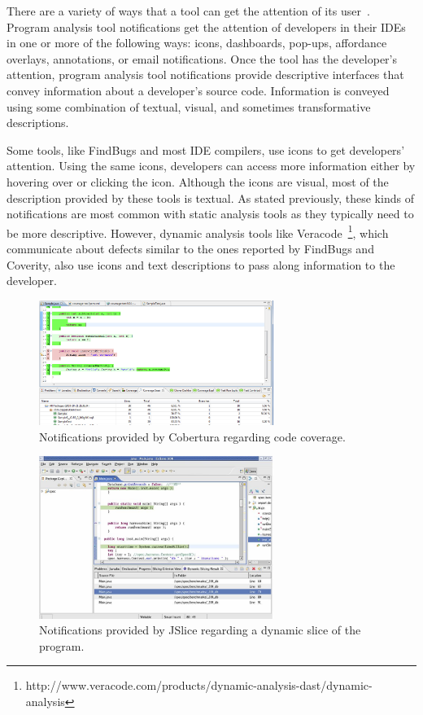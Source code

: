 \documentclass{llncs}
\begin{document}
There are a variety of ways that a tool can get the attention of its user~\cite{robillard2014recommendation}. Program analysis tool notifications get the attention of developers in their IDEs in one or more of the following ways: icons, dashboards, pop-ups, affordance overlays, annotations, or email notifications.
Once the tool has the developer's attention, program analysis tool notifications provide descriptive interfaces that convey information about a developer's source code. 
Information is conveyed using some combination of textual, visual, and sometimes transformative descriptions.

Some tools, like FindBugs and most IDE compilers, use icons to get developers' attention. Using the same icons, developers can access more information either by hovering over or clicking the icon. Although the icons are visual, most of the description provided by these tools is textual. As stated previously, these kinds of notifications are most common with static analysis tools as they typically need to be more descriptive. However, dynamic analysis tools like Veracode~\footnote{http://www.veracode.com/products/dynamic-analysis-dast/dynamic-analysis}, which communicate about defects similar to the ones reported by FindBugs and Coverity, also use icons and text descriptions to pass along information to the developer.

\begin{figure}
	\centering
	\includegraphics[width=3in]{figs/cobertura.png}
	\caption{Notifications provided by Cobertura regarding code coverage.}
	\label{fig:cobertura}
\end{figure}

\begin{figure}
	\centering
	\includegraphics[width=3in]{figs/jslice.jpg}
	\caption{Notifications provided by JSlice regarding a dynamic slice of the program.}
	\label{fig:jslice}
\end{figure}
\end{document}
